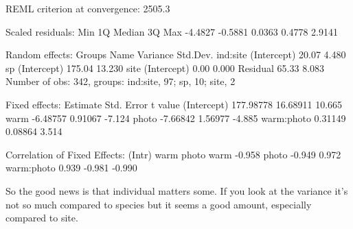 \documentclass{article}
\begin{document}
\begin{Schunk}
\begin{Soutput}
REML criterion at convergence: 2505.3

Scaled residuals: 
    Min      1Q  Median      3Q     Max 
-4.4827 -0.5881  0.0363  0.4778  2.9141 

Random effects:
 Groups   Name        Variance Std.Dev.
 ind:site (Intercept)  20.07    4.480  
 sp       (Intercept) 175.04   13.230  
 site     (Intercept)   0.00    0.000  
 Residual              65.33    8.083  
Number of obs: 342, groups:  ind:site, 97; sp, 10; site, 2

Fixed effects:
             Estimate Std. Error t value
(Intercept) 177.98778   16.68911  10.665
warm         -6.48757    0.91067  -7.124
photo        -7.66842    1.56977  -4.885
warm:photo    0.31149    0.08864   3.514

Correlation of Fixed Effects:
           (Intr) warm   photo 
warm       -0.958              
photo      -0.949  0.972       
warm:photo  0.939 -0.981 -0.990
\end{Soutput}
\end{Schunk}

So the good news is that individual matters some. If you look at the variance it's not so much compared to species but it seems a good amount, especially compared to site.
\end{document}
